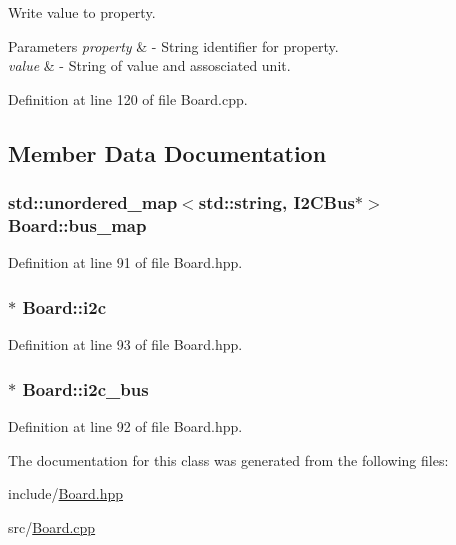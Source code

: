 Write value to property. 


\begin{DoxyParams}{Parameters}
{\em property} & -\/ String identifier for property. \\
\hline
{\em value} & -\/ String of value and assosciated unit. \\
\hline
\end{DoxyParams}


Definition at line 120 of file Board.\+cpp.



\subsection{Member Data Documentation}
\subsubsection[{\texorpdfstring{bus\+\_\+map}{bus_map}}]{\setlength{\rightskip}{0pt plus 5cm}std\+::unordered\+\_\+map$<$std\+::string, {\bf I2\+C\+Bus}$\ast$$>$ Board\+::bus\+\_\+map\hspace{0.3cm}{\ttfamily [protected]}}\hypertarget{class_board_ac5fa25970ad12aa7d2c710bbcdd05339}{}\label{class_board_ac5fa25970ad12aa7d2c710bbcdd05339}


Definition at line 91 of file Board.\+hpp.

\subsubsection[{\texorpdfstring{i2c}{i2c}}]{$\ast$ Board\+::i2c\hspace{0.3cm}{\ttfamily [protected]}}\hypertarget{class_board_aec7b3a540a138062fc54587e1040d917}{}\label{class_board_aec7b3a540a138062fc54587e1040d917}


Definition at line 93 of file Board.\+hpp.

\subsubsection[{\texorpdfstring{i2c\+\_\+bus}{i2c_bus}}]{$\ast$ Board\+::i2c\+\_\+bus\hspace{0.3cm}{\ttfamily [protected]}}\hypertarget{class_board_a4458164bae62e6ba213a08a767242f9f}{}\label{class_board_a4458164bae62e6ba213a08a767242f9f}


Definition at line 92 of file Board.\+hpp.



The documentation for this class was generated from the following files\+:\begin{DoxyCompactItemize}
\item 
include/\hyperlink{_board_8hpp}{Board.\+hpp}\item 
src/\hyperlink{_board_8cpp}{Board.\+cpp}\end{DoxyCompactItemize}
